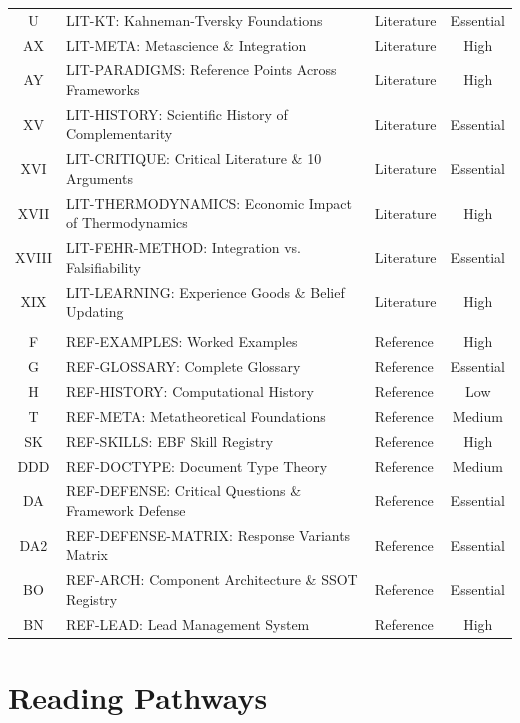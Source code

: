 \begin{table}[htbp]
\begin{tabular}{@{}cllc@{}}
U & LIT-KT: Kahneman-Tversky Foundations & Literature & Essential \\
AX & LIT-META: Metascience \& Integration & Literature & High \\
AY & LIT-PARADIGMS: Reference Points Across Frameworks & Literature & High \\
XV & LIT-HISTORY: Scientific History of Complementarity & Literature & Essential \\
XVI & LIT-CRITIQUE: Critical Literature \& 10 Arguments & Literature & Essential \\
XVII & LIT-THERMODYNAMICS: Economic Impact of Thermodynamics & Literature & High \\
XVIII & LIT-FEHR-METHOD: Integration vs. Falsifiability & Literature & Essential \\
XIX & LIT-LEARNING: Experience Goods \& Belief Updating & Literature & High \\
\addlinespace
\multicolumn{4}{@{}l}{\textit{\textbf{REF (9)}}} \\
F & REF-EXAMPLES: Worked Examples & Reference & High \\
G & REF-GLOSSARY: Complete Glossary & Reference & Essential \\
H & REF-HISTORY: Computational History & Reference & Low \\
T & REF-META: Metatheoretical Foundations & Reference & Medium \\
SK & REF-SKILLS: EBF Skill Registry & Reference & High \\
DDD & REF-DOCTYPE: Document Type Theory & Reference & Medium \\
DA & REF-DEFENSE: Critical Questions \& Framework Defense & Reference & Essential \\
DA2 & REF-DEFENSE-MATRIX: Response Variants Matrix & Reference & Essential \\
BO & REF-ARCH: Component Architecture \& SSOT Registry & Reference & Essential \\
BN & REF-LEAD: Lead Management System & Reference & High \\
\bottomrule
\end{tabular}
\end{table}

\section{Reading Pathways}
\label{sec:index-pathways}


